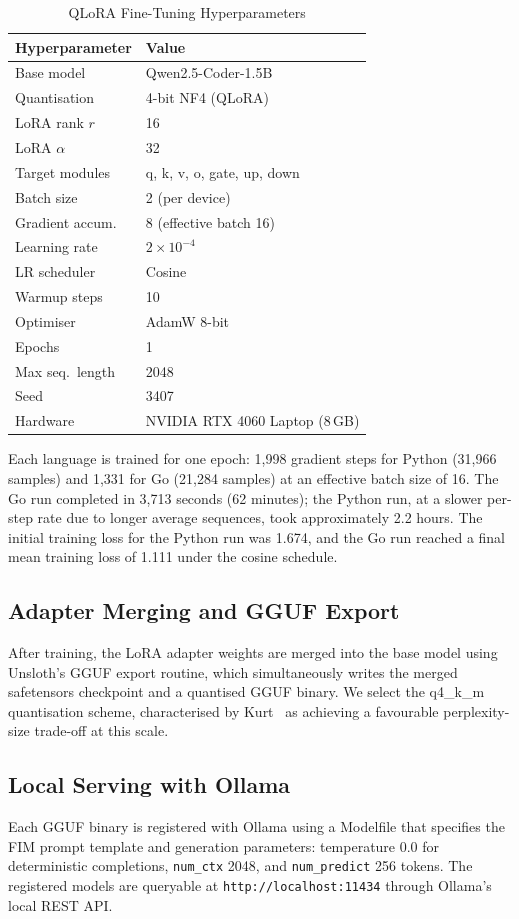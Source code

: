 \begin{table}[htbp]
  \centering
  \caption{QLoRA Fine-Tuning Hyperparameters}
  \label{tab:hyperparams}
  \begin{tabular}{ll}
    \toprule
    \textbf{Hyperparameter} & \textbf{Value} \\
    \midrule
    Base model       & Qwen2.5-Coder-1.5B \\
    Quantisation     & 4-bit NF4 (QLoRA) \\
    LoRA rank $r$    & 16 \\
    LoRA $\alpha$    & 32 \\
    Target modules   & q, k, v, o, gate, up, down \\
    Batch size       & 2 (per device) \\
    Gradient accum.  & 8 (effective batch 16) \\
    Learning rate    & $2 \times 10^{-4}$ \\
    LR scheduler     & Cosine \\
    Warmup steps     & 10 \\
    Optimiser        & AdamW 8-bit \\
    Epochs           & 1 \\
    Max seq.\ length & 2048 \\
    Seed             & 3407 \\
    Hardware         & NVIDIA RTX 4060 Laptop (8\,GB) \\
    \bottomrule
  \end{tabular}
\end{table}

Each language is trained for one epoch: 1,998 gradient steps for
Python (31,966 samples) and 1,331 for Go (21,284 samples) at an
effective batch size of 16. The Go run completed in 3,713 seconds
(62 minutes); the Python run, at a slower per-step rate due to longer
average sequences, took approximately 2.2 hours. The initial training
loss for the Python run was 1.674, and the Go run reached a final mean
training loss of 1.111 under the cosine schedule.

\subsection{Adapter Merging and GGUF Export}

After training, the LoRA adapter weights are merged into the base
model using Unsloth's GGUF export routine, which simultaneously
writes the merged safetensors checkpoint and a quantised GGUF binary.
We select the q4\_k\_m quantisation scheme, characterised by
Kurt~\cite{Kurt2026Quant} as achieving a favourable
perplexity-size trade-off at this scale.

\subsection{Local Serving with Ollama}

Each GGUF binary is registered with Ollama using a Modelfile that
specifies the FIM prompt template and generation parameters:
temperature 0.0 for deterministic completions, \texttt{num\_ctx} 2048,
and \texttt{num\_predict} 256 tokens. The registered models are
queryable at \texttt{http://localhost:11434} through Ollama's local
REST API.
